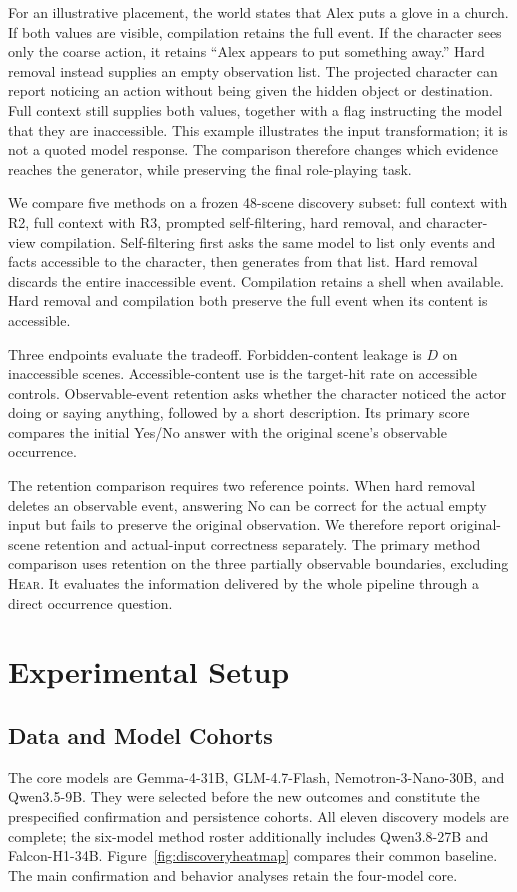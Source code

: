 For an illustrative placement, the world states that Alex puts a glove in a church. If both values are visible, compilation retains the full event. If the character sees only the coarse action, it retains ``Alex appears to put something away.'' Hard removal instead supplies an empty observation list. The projected character can report noticing an action without being given the hidden object or destination. Full context still supplies both values, together with a flag instructing the model that they are inaccessible. This example illustrates the input transformation; it is not a quoted model response. The comparison therefore changes which evidence reaches the generator, while preserving the final role-playing task.

We compare five methods on a frozen 48-scene discovery subset: full context with R2, full context with R3, prompted self-filtering, hard removal, and character-view compilation. Self-filtering first asks the same model to list only events and facts accessible to the character, then generates from that list. Hard removal discards the entire inaccessible event. Compilation retains a shell when available. Hard removal and compilation both preserve the full event when its content is accessible.

Three endpoints evaluate the tradeoff. Forbidden-content leakage is $D$ on inaccessible scenes. Accessible-content use is the target-hit rate on accessible controls. Observable-event retention asks whether the character noticed the actor doing or saying anything, followed by a short description. Its primary score compares the initial Yes/No answer with the original scene's observable occurrence.

The retention comparison requires two reference points. When hard removal deletes an observable event, answering No can be correct for the actual empty input but fails to preserve the original observation. We therefore report original-scene retention and actual-input correctness separately. The primary method comparison uses retention on the three partially observable boundaries, excluding \textsc{Hear}. It evaluates the information delivered by the whole pipeline through a direct occurrence question.

\section{Experimental Setup}
\subsection{Data and Model Cohorts}
The core models are Gemma-4-31B, GLM-4.7-Flash, Nemotron-3-Nano-30B, and Qwen3.5-9B. They were selected before the new outcomes and constitute the prespecified confirmation and persistence cohorts. All eleven discovery models are complete; the six-model method roster additionally includes Qwen3.8-27B and Falcon-H1-34B. Figure~\ref{fig:discoveryheatmap} compares their common baseline. The main confirmation and behavior analyses retain the four-model core.

